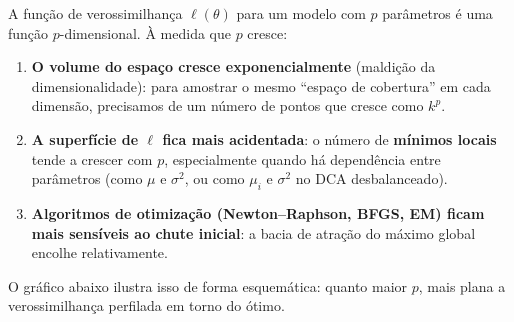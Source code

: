 \documentclass[
]{article}
\providecommand{\tightlist}{%
  \setlength{\itemsep}{0pt}\setlength{\parskip}{0pt}}
\begin{document}
A função de verossimilhança \(\ell(\theta)\) para um modelo com \(p\)
parâmetros é uma função \(p\)-dimensional. À medida que \(p\) cresce:

\begin{enumerate}
\def\labelenumi{\arabic{enumi}.}
\tightlist
\item
  \textbf{O volume do espaço cresce exponencialmente} (maldição da
  dimensionalidade): para amostrar o mesmo ``espaço de cobertura'' em
  cada dimensão, precisamos de um número de pontos que cresce como
  \(k^p\).
\item
  \textbf{A superfície de \(\ell\) fica mais acidentada}: o número de
  \textbf{mínimos locais} tende a crescer com \(p\), especialmente
  quando há dependência entre parâmetros (como \(\mu\) e \(\sigma^2\),
  ou como \(\mu_i\) e \(\sigma^2\) no DCA desbalanceado).
\item
  \textbf{Algoritmos de otimização (Newton--Raphson, BFGS, EM) ficam
  mais sensíveis ao chute inicial}: a bacia de atração do máximo global
  encolhe relativamente.
\end{enumerate}

O gráfico abaixo ilustra isso de forma esquemática: quanto maior \(p\),
mais plana a verossimilhança perfilada em torno do ótimo.
\end{document}
